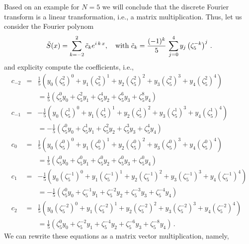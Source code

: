 \documentclass[a4paper, 10pt]{article}
\begin{document}
{Based on an example for $N=5$ we will conclude that the discrete Fourier transform is a linear transformation, i.e., a matrix multiplication. Thus, let us consider the Fourier polynom
\begin{equation*}
\tilde S(x) = \sum\limits_{k=-2}^{2} \tilde c_k e^{i\,k\,x}, \quad \textnormal{with } \tilde c_k = \frac{(-1)^k}{5} \, \sum\limits_{j=0}^4 y_j \left( \zeta^{-k}_5\right)^j\,.
\end{equation*}
and explicity compute the coefficients, i.e.,
\begin{eqnarray*}
c_{-2} &=& \frac15 \left( y_0 (\zeta^2_5)^0 + y_1 (\zeta^2_5)^1 + y_2 (\zeta^2_5)^2 + y_3 (\zeta^2_5)^3 + y_4 (\zeta^2_5)^4\right) \\
&& =  \frac15 \left( \zeta^0_5 y_0  + \zeta^2_5 y_1 + \zeta^4_5 y_2 + \zeta^6_5y_3 + \zeta^8_5y_4 \right) \\
c_{-1} &=& -\frac15 \left( y_0 (\zeta^1_5)^0 + y_1 (\zeta^1_5)^1 + y_2 (\zeta^1_5)^2 + y_3 (\zeta^1_5)^3 + y_4 (\zeta^1_5)^4\right) \\
&& =  -\frac15 \left( \zeta^0_5 y_0  + \zeta^1_5 y_1 + \zeta^2_5 y_2 + \zeta^3_5y_3 + \zeta^4_5y_4 \right) \\
c_{0} &=& \frac15 \left( y_0 (\zeta^0_5)^0 + y_1 (\zeta^0_5)^1 + y_2 (\zeta^0_5)^2 + y_3 (\zeta^0_5)^3 + y_4 (\zeta^0_5)^4\right) \\
&&=  \frac15 \left( \zeta^0_5 y_0  + \zeta^0_5 y_1 + \zeta^0_5 y_2 + \zeta^0_5y_3 + \zeta^0_5y_4 \right) \\
c_{1} &=& -\frac15 \left( y_0 (\zeta^{-1}_5)^0 + y_1 (\zeta^{-1}_5)^1 + y_2 (\zeta^{-1}_5)^2 + y_3 (\zeta^{-1}_5)^3 + y_4 (\zeta^{-1}_5)^4\right)  \\
&&=  -\frac15 \left( \zeta^0_5 y_0  + \zeta^{-1}_5 y_1 + \zeta^{-2}_5 y_2 + \zeta^{-3}_5y_3 + \zeta^{-4}_5y_4 \right) \\
c_{2} &=& \frac15 \left( y_0 (\zeta^{-2}_5)^0 + y_1 (\zeta^{-2}_5)^1 + y_2 (\zeta^{-2}_5)^2 + y_3 (\zeta^{-2}_5)^3 + y_4 (\zeta^{-2}_5)^4\right) \\
&&=  \frac15 \left( \zeta^0_5 y_0  + \zeta^{-2}_5 y_1 + \zeta^{-4}_5 y_2 + \zeta^{-6}_5y_3 + \zeta^{-8}_5y_4 \right)\,.
\end{eqnarray*}
We can rewrite these equations as a matrix vector multiplication, namely,

}
\end{document}
